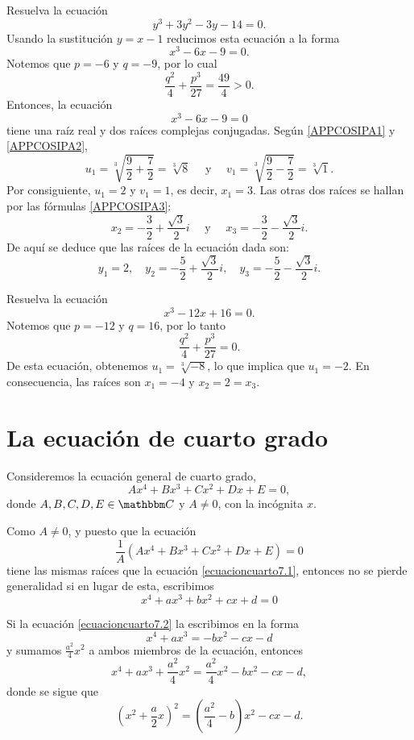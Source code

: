 \begin{example}
    Resuelva la ecuación
    $$y^3+3y^2-3y-14=0.$$
    \solucion Usando la sustitución $y=x-1$ reducimos esta ecuación a la forma
    $$x^3-6x-9=0.$$
    Notemos que $p=-6$ y $q=-9$, por lo cual
    $$\frac{q^2}{4}+\frac{p^3}{27}=\frac{49}{4}>0.$$
    Entonces, la ecuación
    $$x^3-6x-9=0$$
    tiene una raíz real y dos raíces complejas conjugadas. Según \eqref{APPCOSIPA1} y \eqref{APPCOSIPA2},
    $$u_1=\sqrt[3]{\frac{9}{2}+\frac{7}{2}}=\sqrt[3]{8} \quad \text{ y } \quad v_1=\sqrt[3]{\frac{9}{2}-\frac{7}{2}}=\sqrt[3]{1}.$$
    Por consiguiente, $u_1=2$ y $v_1=1$, es decir, $x_1=3$. Las otras dos raíces se hallan por las fórmulas \eqref{APPCOSIPA3}:
    $$x_2=-\frac{3}{2}+\frac{\sqrt{3}}{2}i \quad \text{ y } \quad x_3=-\frac{3}{2}-\frac{\sqrt{3}}{2}i.$$
    De aquí se deduce que las raíces de la ecuación dada son:
    $$y_1=2, \quad y_2=-\frac{5}{2}+\frac{\sqrt{3}}{2}i, \quad y_3=-\frac{5}{2}-\frac{\sqrt{3}}{2}i.$$
\end{example}

\begin{example}
    Resuelva la ecuación
    $$x^3-12x+16=0.$$
    \solucion Notemos que $p=-12$ y $q=16$, por lo tanto
    $$\frac{q^2}{4}+\frac{p^3}{27}=0.$$
    De esta ecuación, obtenemos $u_1=\sqrt[3]{-8}$, lo que implica que $u_1=-2$. En consecuencia, las raíces son $x_1=-4$ y $x_2=2=x_3$.
\end{example}

\newpage
\section{La ecuación de cuarto grado}

Consideremos la ecuación general de cuarto grado,
\begin{equation}
    Ax^4+Bx^3+Cx^2+Dx+E=0, \label{ecuacioncuarto7.1}
\end{equation}
donde $A,  B,  C,  D,  E \in \CC$ y $A \neq 0$, con la incógnita $x$.

Como $A \neq 0$, y puesto que la ecuación
$$\frac{1}{A} \left( Ax^4+Bx^3+Cx^2+Dx+E \right) =0$$
tiene las mismas raíces que la ecuación \eqref{ecuacioncuarto7.1}, entonces no se pierde generalidad si en lugar de esta, escribimos
\begin{equation}
    x^4+ax^3+bx^2+cx+d=0 \label{ecuacioncuarto7.2}
\end{equation}

Si la ecuación \eqref{ecuacioncuarto7.2} la escribimos en la forma
$$x^4+ax^3=-bx^2-cx-d$$
y sumamos $\displaystyle \frac{a^2}{4}x^2$ a ambos miembros de la ecuación, entonces
$$x^4+ax^3+\frac{a^2}{4}x^2=\frac{a^2}{4}x^2-bx^2-cx-d,$$
donde se sigue que
\begin{equation}
    \left( x^2+\frac{a}{2}x \right)^2 = \left( \frac{a^2}{4}-b \right) x^2-cx-d. \label{ecuacioncuarto7.3}
\end{equation}

